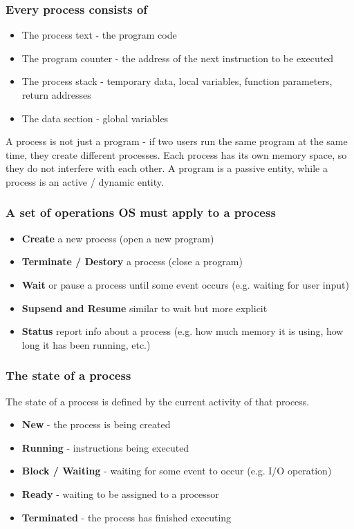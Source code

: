 \documentclass[a4paper, 10pt]{article}
\begin{document}
\subsubsection*{Every process consists of}
\begin{itemize}
    \item The process text - the program code
    \item The program counter - the address of the next instruction to be executed
    \item The process stack - temporary data, local variables, function parameters, return addresses
    \item The data section - global variables
\end{itemize}
A process is not just a program - if two users run the same program at the same time, they create different processes. Each process has its own memory space, so they do not interfere with each other. A program is a passive entity, while a process is an active / dynamic entity.
\subsubsection*{A set of operations OS must apply to a process}
\begin{itemize}
    \item \textbf{Create} a new process (open a new program)
    \item \textbf{Terminate / Destory} a process (close a program)
    \item \textbf{Wait} or pause a process until some event occurs (e.g. waiting for user input)
    \item \textbf{Supsend and Resume} similar to wait but more explicit
    \item \textbf{Status}  report info about a process (e.g. how much memory it is using, how long it has been running, etc.)
\end{itemize}
\subsubsection*{The state of a process}
The state of a process is defined by the current activity of that process.
\begin{itemize}
    \item \textbf{New} - the process is being created
    \item \textbf{Running} - instructions being executed
    \item \textbf{Block / Waiting} - waiting for some event to occur (e.g. I/O operation)
    \item \textbf{Ready} - waiting to be assigned to a processor
    \item \textbf{Terminated} - the process has finished executing
\end{itemize}
\end{document}
